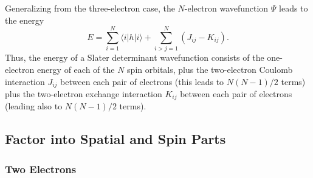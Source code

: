 {Generalizing from the three-electron case, the $N$-electron wavefunction 
$\Psi$ leads to the energy
\begin{equation}
E = \sum^{N}_{i=1} \langle i | h | i \rangle + \sum^{N}_{i>j=1} \left( 
J_{ij} - K_{ij} \right) .
\label{chap4-eqno44}
\end{equation}
Thus, the energy of a Slater determinant wavefunction consists of the
one-electron energy of each of the $N$ spin orbitals, plus the
two-electron Coulomb interaction $J_{ij}$ between each pair of
electrons (this leads to $N(N - 1)/2$ terms) plus the two-electron
exchange interaction $K_{ij}$ between each pair of electrons (leading
also to $N(N - 1)/2$ terms).

\subsection{Factor into Spatial and Spin Parts}

\subsubsection{Two Electrons}

}
